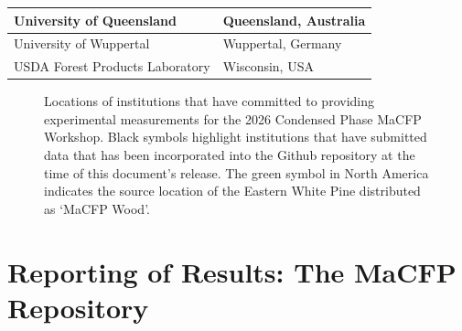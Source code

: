 \documentclass{book}
\begin{document}
\begin{table}
\begin{center}
\begin{tabular}{|ll|}
University of Queensland                & Queensland, Australia \\ \hline
University of Wuppertal 				& Wuppertal, Germany \\  \hline
USDA Forest Products Laboratory			& Wisconsin, USA \\ \hline
\end{tabular}
\end{center}
\end{table}

\begin{figure}[h]

  \centering


  \caption{Locations of institutions that have committed to providing experimental measurements for the 2026 Condensed Phase MaCFP Workshop. Black symbols highlight institutions that have submitted data that has been incorporated into the Github repository at the time of this document's release. The green symbol in North America indicates the source location of the Eastern White Pine distributed as `MaCFP Wood'.}

  \label{Fig:MaCFP4_Map}

\end{figure}

\newpage
\section{Reporting of Results: The MaCFP Repository}
\end{document}
